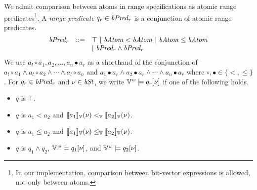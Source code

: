 We admit comparison between atoms in range specifications as atomic range predicates\footnote{In our implementation, comparison between bit-vector expressions is allowed, not only between atoms.}.
A \emph{range predicate} $q_r \in \mathit{bPred_r}$ is a conjunction of atomic range predicates.
\[
\begin{array}{rcl}
  \mathit{bPred_r} & ::= & \top \ |\ \mathit{bAtom} < \mathit{bAtom} \ |\ \mathit{bAtom} \leq \mathit{bAtom} \\
           &     & |\ \mathit{bPred_r} \wedge \mathit{bPred_r} \\
\end{array}
\]
We use $a_l \circ a_1, a_2, \ldots, a_n \bullet a_r$ as a shorthand of the conjunction of $a_l \circ a_1 \wedge a_l \circ a_2 \wedge \cdots \wedge a_l \circ a_n$ and $a_1 \bullet a_r \wedge a_2 \bullet a_r \wedge \cdots \wedge a_n \bullet a_r$ where $\circ, \bullet \in \{<, \leq\}$.
For $q_r \in \mathit{bPred_r}$ and $\nu \in \mathit{bSt}$, we write $\mathbb{V}^{\mathit{w}} \models q_r[\nu]$ if one of the following holds.
\begin{itemize}
  \item $q$ is $\top$.
  \item $q$ is $a_1 < a_2$ and $[\![{a_1}]\!]_{\mathbb{V}}(\nu) <_{\mathbb{V}} [\![{a_2}]\!]_{\mathbb{V}}(\nu)$.
  \item $q$ is $a_1 \leq a_2$ and $[\![{a_1}]\!]_{\mathbb{V}}(\nu) \leq_{\mathbb{V}} [\![{a_2}]\!]_{\mathbb{V}}(\nu)$.
  \item $q$ is $q_1 \wedge q_2$, $\mathbb{V}^{\mathit{w}} \models q_1[\nu]$, and $\mathbb{V}^{\mathit{w}} \models q_2[\nu]$.
\end{itemize}

